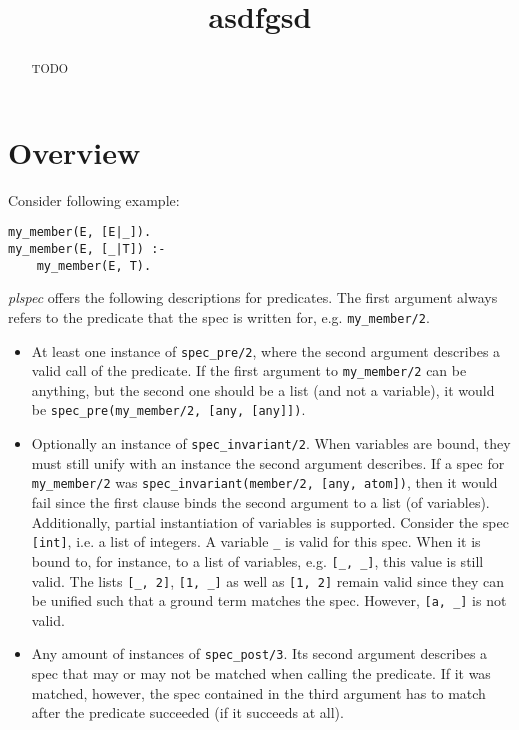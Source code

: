 \documentclass{article}
\title{asdfgsd}
\begin{document}
\maketitle

\begin{abstract}
TODO
\end{abstract}

\section{Overview}

Consider following example:

\begin{verbatim}
my_member(E, [E|_]).
my_member(E, [_|T]) :-
    my_member(E, T).
\end{verbatim}

\emph{plspec} offers the following descriptions for predicates.
The first argument always refers to the predicate that the spec is written for,
e.g. \verb|my_member/2|.

\begin{itemize}
    \item
        At least one instance of \verb|spec_pre/2|,
        where the second argument describes a valid call of the predicate.
        If the first argument to \verb|my_member/2| can be anything,
        but the second one should be a list (and not a variable),
        it would be \verb|spec_pre(my_member/2, [any, [any]])|.

    \item
        Optionally an instance of \verb|spec_invariant/2|.
        When variables are bound,
        they must still unify with an instance the second argument describes.
        If a spec for \verb|my_member/2| was
        \verb|spec_invariant(member/2, [any, atom])|,
        then it would fail since the first clause
        binds the second argument to a list (of variables).
        Additionally, partial instantiation of variables is supported.
        Consider the spec \verb|[int]|, i.e. a list of integers.
        A variable \verb|_| is valid for this spec.
        When it is bound to, for instance, to a list of variables,
        e.g. \verb|[_, _]|, this value is still valid.
        The lists \verb|[_, 2]|, \verb|[1, _]| as well as \verb|[1, 2]|
        remain valid since they can be unified such that a ground term matches the spec.
        However, \verb|[a, _]| is not valid.

    \item
        Any amount of instances of \verb|spec_post/3|.
        Its second argument describes a spec
        that may or may not be matched when calling the predicate.
        If it was matched, however, the spec contained in the third argument
        has to match after the predicate succeeded (if it succeeds at all).

\end{itemize}



%
%
\end{document}
